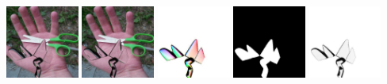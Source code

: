     \\
    \includegraphics[width=0.18\textwidth]{ch-tomnet/images/Synth/synthetic_15_shape0000_COCO_val2014_000000311180_tar.jpg}
    \includegraphics[width=0.18\textwidth]{ch-tomnet/images/Synth/synthetic_15_shape0000_COCO_val2014_000000311180_pred.jpg}
    \includegraphics[width=0.18\textwidth]{ch-tomnet/images/Synth/synthetic_15_shape000311180_gt_fcolor.jpg}
    \includegraphics[width=0.18\textwidth]{ch-tomnet/images/Synth/synthetic_15_shape0000_COCO_val2014_000000311180_gt_mask.jpg}
    \includegraphics[width=0.18\textwidth]{ch-tomnet/images/Synth/synthetic_15_shape0000_COCO_val2014_000000311180_gt_rho.jpg}
